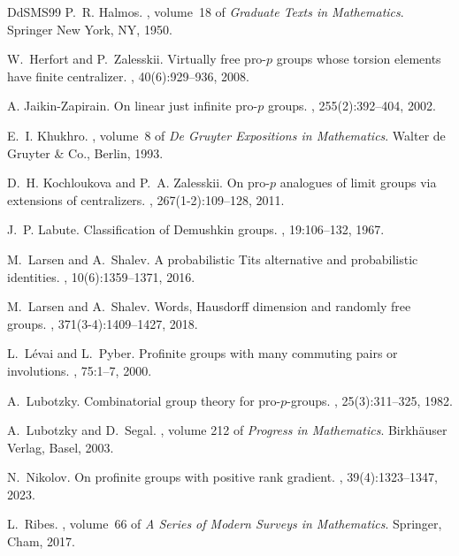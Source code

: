 \documentclass[a4paper,10pt]{amsart}
\theoremstyle{plain}
\theoremstyle{definition}
\numberwithin{equation}{section}
\begin{document}
\begin{thebibliography}{DdSMS99}
P.~R. Halmos.
, volume~18 of {\em Graduate Texts in Mathematics}.
\newblock Springer New York, NY, 1950.

W.~Herfort and P.~Zalesskii.
\newblock Virtually free pro-{$p$} groups whose torsion elements have finite centralizer.
, 40(6):929--936, 2008.

A. Jaikin-Zapirain.
\newblock On linear just infinite pro-{$p$} groups.
, 255(2):392--404, 2002.

E.~I. Khukhro.
, volume~8 of {\em De Gruyter Expositions in Mathematics}.
\newblock Walter de Gruyter \& Co., Berlin, 1993.

D.~H. Kochloukova and P.~A. Zalesskii.
\newblock On pro-{$p$} analogues of limit groups via extensions of centralizers.
, 267(1-2):109--128, 2011.

J.~P. Labute.
\newblock Classification of {D}emushkin groups.
, 19:106--132, 1967.


M.~Larsen and A.~Shalev.
\newblock A probabilistic {T}its alternative and probabilistic identities.
, 10(6):1359--1371, 2016.

M.~Larsen and A.~Shalev.
\newblock Words, {H}ausdorff dimension and randomly free groups.
, 371(3-4):1409--1427, 2018.

L.~L\'evai and L.~Pyber.
\newblock Profinite groups with many commuting pairs or involutions.
, 75:1--7, 2000.

A.~Lubotzky.
\newblock Combinatorial group theory for pro-{$p$}-groups.
, 25(3):311--325, 1982.

A.~Lubotzky and D.~Segal.
, volume 212 of {\em Progress in Mathematics}.
\newblock Birkh\"auser Verlag, Basel, 2003.

N.~Nikolov.
\newblock On profinite groups with positive rank gradient.
, 39(4):1323–1347, 2023.

L.~Ribes.
, volume~66 of {\em A Series of Modern Surveys in Mathematics}.
\newblock Springer, Cham, 2017.


\end{thebibliography}
\end{document}
